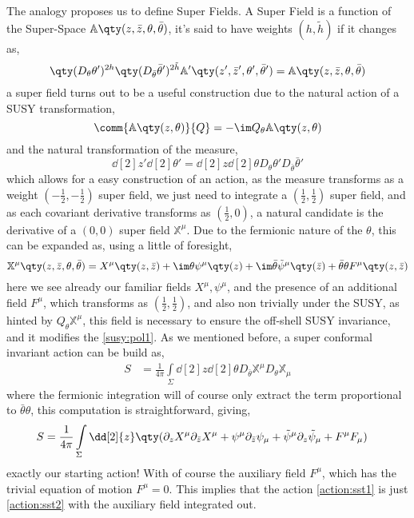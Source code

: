 The analogy proposes us to define Super Fields. 
A Super Field is a function of the Super-Space $\mathbb A\qty(z,\bar z,\theta,\bar\theta)$, it's said to 
have weights $(h,\tilde h)$ if it changes as, $$\qty(D_\theta\theta')^{2h}\qty(D_{\bar\theta}{\bar\theta}')^{2\tilde h}\mathbb A'\qty(z',\bar z',\theta',\bar\theta')=\mathbb A\qty(z,\bar z,\theta,\bar\theta)$$
a super field turns out to be a useful construction due to the natural action of a SUSY transformation,
$$\comm{\mathbb A\qty(z,\theta)}{Q}=-\im Q_\theta\mathbb A\qty(z,\theta)$$
and the natural transformation of the measure,
$$\dd[2]{z'}\dd[2]{\theta'}=\dd[2]{z}\dd[2]{\theta}D_\theta\theta'D_{\bar\theta}{\bar\theta}'$$
which allows for a easy construction of an action, as the measure transforms as a weight $(-\frac12,-\frac12)$ 
super field, we just need to integrate a $(\frac12,\frac12)$ super field, and as each covariant 
derivative transforms as $(\frac12,0)$, a natural candidate is the derivative of a $(0,0)$ super field $\mathbb X^\mu$. 
Due to the fermionic nature of the $\theta$, this can be expanded as, using a little of foresight,
$$\mathbb X^\mu\qty(z,\bar z,\theta,\bar\theta)=X^\mu\qty(z,\bar z)+\im\theta\psi^\mu\qty(z)+\im\bar\theta{\tilde\psi}^\mu\qty(\bar z)+\bar\theta\theta F^\mu\qty(z,\bar z)$$
here we see already our familiar fields $X^\mu,\psi^\mu$, and the presence of an additional field $F^\mu$, 
which transforms as $(\frac12,\frac12)$, and also non trivially under the SUSY, as hinted by $Q_\theta\mathbb X^\mu$, 
this field is necessary to ensure the off-shell SUSY invariance, and it modifies the \eqref{susy:pol1}. 
As we mentioned before, a super conformal invariant action can be build as,
\begin{align}
    S&=\frac{1}{4\pi}\int\limits_\Sigma\dd[2]{z}\dd[2]{\theta}D_{\bar\theta}\mathbb X^\mu D_\theta\mathbb X_\mu\label{action:sst2}
\end{align}
where the fermionic integration will of course only extract the term proportional to $\bar\theta\theta$, this 
computation is straightforward, giving,
\begin{align*}
    S&=\frac{1}{4\pi}\int\limits_\Sigma\dd[2]{z}\qty(\partial_zX^\mu\partial_{\bar z}X^\mu+\psi^\mu\partial_{\bar z}\psi_\mu+{\tilde\psi}^\mu\partial_z{\tilde\psi}_\mu+F^\mu F_\mu)
\end{align*}
exactly our starting action! With of course the auxiliary field $F^\mu$, which has the trivial equation of motion $F^\mu=0$. 
This implies that the action \eqref{action:sst1} is just \eqref{action:sst2} with the auxiliary field integrated out.

